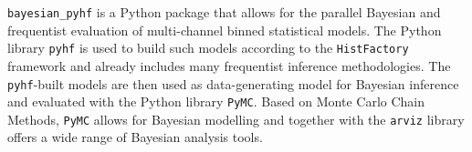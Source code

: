 \texttt{bayesian\_pyhf} is a Python package that allows for the parallel Bayesian and frequentist evaluation of multi-channel binned statistical models. The Python library \texttt{pyhf} is used to build such models according to the \texttt{HistFactory} framework and already includes many frequentist inference methodologies. The \texttt{pyhf}-built models are then used as data-generating model for Bayesian inference and evaluated with the Python library \texttt{PyMC}. Based on Monte Carlo Chain Methods, \texttt{PyMC} allows for Bayesian modelling and together with the \texttt{arviz} library offers a wide range of Bayesian analysis tools.
